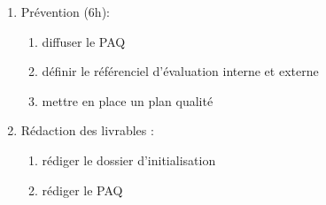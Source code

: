 \begin{enumerate}
\begin{enumerate}
            \item Prévention (6h):
                \begin{enumerate}
                  \item diffuser le PAQ 
                  \item définir le référenciel d'évaluation interne et externe 
                  \item mettre en place un plan qualité 
                \end{enumerate}

            \item Rédaction des livrables : 
                \begin{enumerate}
                  \item rédiger le dossier d'initialisation 
                  \item rédiger le PAQ 
                \end{enumerate}
          \end{enumerate}


\end{enumerate}
